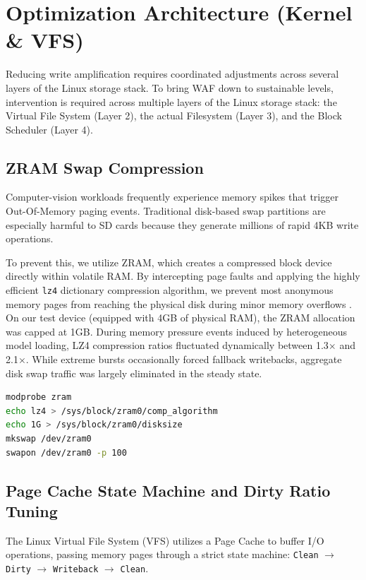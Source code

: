\documentclass[conference]{IEEEtran}
\begin{document}
\section{Optimization Architecture (Kernel \& VFS)}

Reducing write amplification requires coordinated adjustments across several layers of the Linux storage stack. To bring WAF down to sustainable levels, intervention is required across multiple layers of the Linux storage stack: the Virtual File System (Layer 2), the actual Filesystem (Layer 3), and the Block Scheduler (Layer 4).

\subsection{ZRAM Swap Compression}
Computer-vision workloads frequently experience memory spikes that trigger Out-Of-Memory paging events. Traditional disk-based swap partitions are especially harmful to SD cards because they generate millions of rapid 4KB write operations. 

To prevent this, we utilize ZRAM, which creates a compressed block device directly within volatile RAM. By intercepting page faults and applying the highly efficient \texttt{lz4} dictionary compression algorithm, we prevent most anonymous memory pages from reaching the physical disk during minor memory overflows \cite{b13, b14}. On our test device (equipped with 4GB of physical RAM), the ZRAM allocation was capped at 1GB. During memory pressure events induced by heterogeneous model loading, LZ4 compression ratios fluctuated dynamically between 1.3$\times$ and 2.1$\times$. While extreme bursts occasionally forced fallback writebacks, aggregate disk swap traffic was largely eliminated in the steady state.

\begin{lstlisting}[language=bash, caption={ZRAM Activation Sequence}, label={lst:zram}]
modprobe zram
echo lz4 > /sys/block/zram0/comp_algorithm
echo 1G > /sys/block/zram0/disksize
mkswap /dev/zram0
swapon /dev/zram0 -p 100
\end{lstlisting}

\subsection{Page Cache State Machine and Dirty Ratio Tuning}
The Linux Virtual File System (VFS) utilizes a Page Cache to buffer I/O operations, passing memory pages through a strict state machine: \texttt{Clean} $\to$ \texttt{Dirty} $\to$ \texttt{Writeback} $\to$ \texttt{Clean}. 
\end{document}
